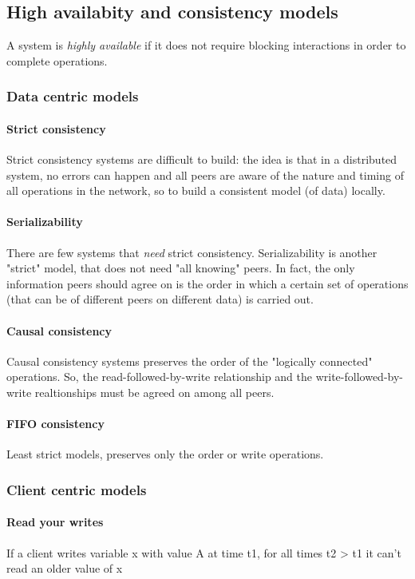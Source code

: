 \documentclass[10pt,a4paper]{article}
\begin{document}
			\subsection{High availabity and consistency models}
				A system is \emph{highly available} if it does not require blocking interactions in order to complete operations.
				\subsubsection{Data centric models}
					\paragraph{Strict consistency}
						Strict consistency systems are difficult to build: the idea is that in a distributed system, no errors can happen and all peers are aware of the nature and timing of all operations in the network, so to build a consistent model (of data) locally.
					\paragraph{Serializability}
						There are few systems that \emph{need} strict consistency. Serializability is another "strict" model, that does not need "all knowing" peers. In fact, the only information peers should agree on is the order in which a certain set of operations (that can be of different peers on different data) is carried out.
					\paragraph{Causal consistency}
						Causal consistency systems preserves the order of the "logically connected" operations. So, the read-followed-by-write relationship and the write-followed-by-write realtionships must be agreed on among all peers.
					\paragraph{FIFO consistency}
						Least strict models, preserves only the order or write operations.
				\subsubsection{Client centric models}
					\paragraph{Read your writes}
						If a client writes variable x with value A at time t1, for all times t2 > t1 it can't read an older value of x
\end{document}
